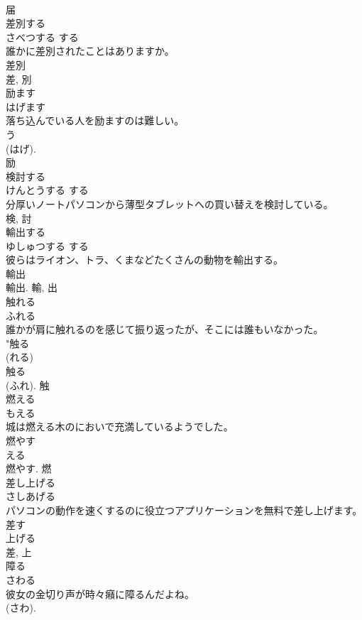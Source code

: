 \documentclass[8pt]{extreport}
\begin{document}
\begin{CJK}{UTF8}{min}
\\	届	
\\	差別する	
\\	さべつする	する 
\\	誰かに差別されたことはありますか。	
\\	差別 
\\	差, 別	
\\	励ます	
\\	はげます	
\\	落ち込んでいる人を励ますのは難しい。	
\\	う 
\\	(はげ). 
\\	励	
\\	検討する	
\\	けんとうする	する 
\\	分厚いノートパソコンから薄型タブレットへの買い替えを検討している。	
\\	検, 討	
\\	輸出する	
\\	ゆしゅつする	する 
\\	彼らはライオン、トラ、くまなどたくさんの動物を輸出する。	
\\	輸出 
\\	輸出.	輸, 出	
\\	触れる	
\\	ふれる	
\\	誰かが肩に触れるのを感じて振り返ったが、そこには誰もいなかった。	
\\	"触る 
\\	(れる) 
\\	触る 
\\	(ふれ).	触	
\\	燃える	
\\	もえる	
\\	城は燃える木のにおいで充満しているようでした。	
\\	燃やす 
\\	える 
\\	燃やす.	燃	
\\	差し上げる	
\\	さしあげる	
\\	パソコンの動作を速くするのに役立つアプリケーションを無料で差し上げます。	
\\	差す 
\\	上げる 
\\	差, 上	
\\	障る	
\\	さわる	
\\	彼女の金切り声が時々癪に障るんだよね。	
\\	(さわ). 

\end{CJK}
\end{document}
